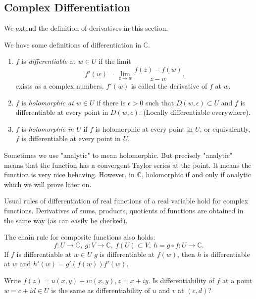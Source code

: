\subsection{Complex Differentiation}
We extend the definition of derivatives in this section.
\begin{definition}{}{}
    We have some definitions of differentiation in \(\mathbb{C}\).
    \begin{enumerate}
        \item \(f\) is \textit{differentiable} at \(w \in U\) if the limit
        \[
            f'(w)=\lim\limits_{z \to w}\frac{f(z)-f(w)}{z-w}.
        \]
        exists as a complex numbers. \(f'(w)\) is called the derivative of \(f\) at \(w\).
        \item \(f\) is \textit{holomorphic at \(w \in U\)} if there is \(\epsilon>0\) such that \(D(w, \epsilon) \subset U\) and \(f\) is differentiable at every point in \(D(w, \epsilon)\). (Locally differentiable everywhere).
        \item \(f\)  is \textit{holomorphic in \(U\)} if \(f\) is holomorphic at every point in \(U\), or equivalently, \(f\) is differentiable at every point in \(U\).
    \end{enumerate}
\end{definition}
\begin{remark}
    Sometimes we use "analytic" to mean holomorphic. But precisely "analytic" means that the function has a convergent Taylor series at the point. It means the function is very nice behaving. However, in \(\mathbb{C}\), holomorphic if and only if analytic which we will prove later on.
\end{remark}
Usual rules of differentiation of real functions of a real variable hold for complex functions. Derivatives of sums, products, quotients of functions are obtained in the same way (as can easily be checked).

The chain rule for composite functions also holds:
\[
    f:U\to\mathbb{C},~g:V\to \mathbb{C},~f(U)\subset V,~h=g\circ f:U \to \mathbb{C}.
\]
If \(f\) is differentiable at \(w \in U\) \(g\) is differentiable at \(f(w)\), then \(h\) is differentiable at \(w\) and \(h'(w)=g'(f(w))f'(w)\).

\begin{problem}
    Write \(f(z) = u(x,y)+iv(x,y),z=x+iy\). Is differentiability of \(f\) at a point \(w = c + id \in U\) is the same as differentiability of \(u\) and \(v\) at \((c,d)\)?
\end{problem}

